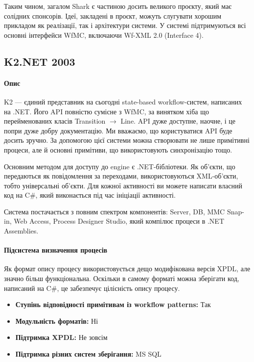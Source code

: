 \documentclass{memoir}
\begin{document}
Таким чином, загалом Shark є частиною досить великого проєкту, який має солідних спонсорів. Ідеї, закладені в проєкт, можуть слугувати хорошим прикладом як реалізації, так і архітектури системи. У системі підтримуються всі основні інтерфейси WfMC, включаючи Wf-XML 2.0 (Interface 4).

\subsection{K2.NET 2003}

\paragraph{Опис}

K2 — єдиний представник на сьогодні state-based workflow-систем, написаних на .NET. Його API повністю сумісне з WfMC, за винятком хіба що перейменованих класів Transition $\to$ Line. API дуже доступне, наочне, і це попри дуже добру документацію. Ми вважаємо, що користуватися API буде досить зручно. За допомогою цієї системи можна створювати не лише примітивні процеси, але й основні примітиви, що використовують синхронізацію тощо.

Основним методом для доступу до engine є .NET-бібліотеки. Як об’єкти, що передаються як повідомлення за переходами, використовуються XML-об’єкти, тобто універсальні об’єкти. Для кожної активності ви можете написати власний код на C\#, який виконається під час ініціації активності.

Система постачається з повним спектром компонентів: Server, DB, MMC Snap-in, Web Access, Process Designer Studio, який компілює процеси в .NET Assemblies.

\paragraph{Підсистема визначення процесів}

Як формат опису процесу використовується дещо модифікована версія XPDL, але значно більш функціональна. Оскільки в самому форматі можна зберігати код, написаний на C\#, це забезпечує цілісність опису процесу.

\begin{itemize}
    \item \textbf{Ступінь відповідності примітивам із workflow patterns:} Так
    \item \textbf{Модульність форматів:} Ні
    \item \textbf{Підтримка XPDL:} Не зовсім
    \item \textbf{Підтримка різних систем зберігання:} MS SQL
\end{itemize}
\end{document}

